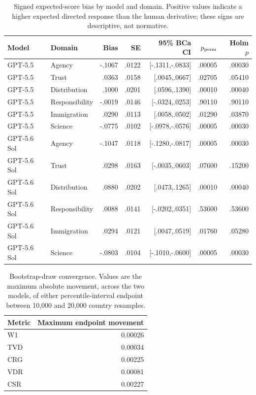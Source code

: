 \FloatBarrier
\begin{table}[!htbp]
\centering
\small
\setlength{\tabcolsep}{2.0pt}
\caption{Signed expected-score bias by model and domain. Positive values indicate a higher expected directed response than the human derivative; these signs are descriptive, not normative.}\label{tab:signed-bias}
\begin{tabular}{@{}llrrrrr@{}}
\toprule
\rowcolor{tablehead} Model & Domain & Bias & SE & 95\% BCa CI & $p_{\rm perm}$ & Holm $p$ \\
\midrule
GPT-5.5 & Agency & -.1067 & .0122 & [-.1311,-.0833] & .00005 & .00030 \\
GPT-5.5 & Trust & .0363 & .0158 & [.0045,.0667] & .02705 & .05410 \\
GPT-5.5 & Distribution & .1000 & .0201 & [.0596,.1390] & .00010 & .00040 \\
GPT-5.5 & Responsibility & -.0019 & .0146 & [-.0324,.0253] & .90110 & .90110 \\
GPT-5.5 & Immigration & .0290 & .0113 & [.0058,.0502] & .01290 & .03870 \\
GPT-5.5 & Science & -.0775 & .0102 & [-.0978,-.0576] & .00005 & .00030 \\
GPT-5.6 Sol & Agency & -.1047 & .0118 & [-.1280,-.0817] & .00005 & .00030 \\
GPT-5.6 Sol & Trust & .0298 & .0163 & [-.0035,.0603] & .07600 & .15200 \\
GPT-5.6 Sol & Distribution & .0880 & .0202 & [.0473,.1265] & .00010 & .00040 \\
GPT-5.6 Sol & Responsibility & .0088 & .0141 & [-.0202,.0351] & .53600 & .53600 \\
GPT-5.6 Sol & Immigration & .0294 & .0121 & [.0047,.0519] & .01760 & .05280 \\
GPT-5.6 Sol & Science & -.0803 & .0104 & [-.1010,-.0600] & .00005 & .00030 \\
\bottomrule
\end{tabular}
\end{table}
\begin{table}[!htbp]
\centering
\caption{Bootstrap-draw convergence. Values are the maximum absolute movement, across the two models, of either percentile-interval endpoint between 10,000 and 20,000 country resamples.}\label{tab:bootstrap-convergence}
\small
\begin{tabular}{lr}
\toprule
\rowcolor{tablehead} Metric & Maximum endpoint movement \\
\midrule
W1 & 0.00026 \\
TVD & 0.00034 \\
CRG & 0.00225 \\
VDR & 0.00081 \\
CSR & 0.00227 \\
\bottomrule
\end{tabular}
\end{table}
